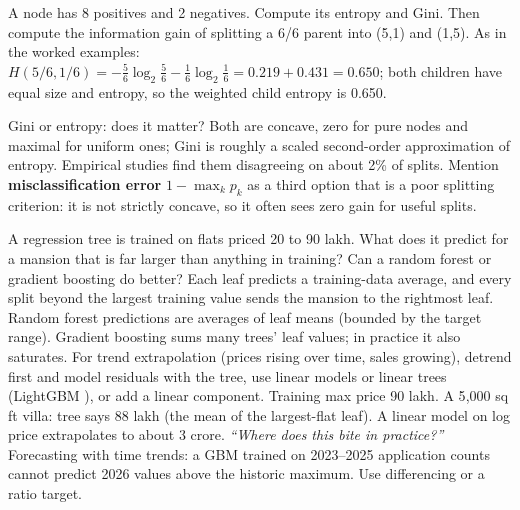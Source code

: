 \begin{qa}{ A node has 8 positives and 2 negatives. Compute its entropy and Gini. Then
compute the information gain of splitting a 6/6 parent into (5,1) and (1,5).}
\why As in the worked examples: $H(5/6,1/6) = -\frac56\log_2\frac56 - \frac16\log_2\frac16 = 0.219 + 0.431 = 0.650$; both
children have equal size and entropy, so the weighted child entropy is 0.650.
\end{qa}

\begin{qa}{Gini or entropy: does it matter?}
\why Both are concave, zero for pure nodes and maximal for uniform ones; Gini is roughly a scaled second-order approximation
of entropy. Empirical studies find them disagreeing on about 2\% of splits. Mention \textbf{misclassification error}
$1 - \max_kp_k$ as a third option that is a poor splitting criterion: it is not strictly concave, so it often sees zero gain
for useful splits.
\end{qa}

\begin{qa}{\deep A regression tree is trained on flats priced 20 to 90 lakh. What does it predict for a mansion that is far
larger than anything in training? Can a random forest or gradient boosting do better?}
\why Each leaf predicts a training-data average, and every split beyond the largest training value sends the mansion to the
rightmost leaf. Random forest predictions are averages of leaf means (bounded by the target range). Gradient boosting
sums many trees' leaf values; in practice it also saturates. For trend extrapolation (prices rising over time, sales growing),
detrend first and model residuals with the tree, use linear models or linear trees (LightGBM ), or add a
linear component.
\worked Training max price 90 lakh. A 5{,}000 sq ft villa: tree says 88 lakh (the mean of the largest-flat leaf). A linear model
on log price extrapolates to about 3 crore.
\pushes \emph{``Where does this bite in practice?''} Forecasting with time trends: a GBM trained on 2023--2025 application
counts cannot predict 2026 values above the historic maximum. Use differencing or a ratio target.
\end{qa}

